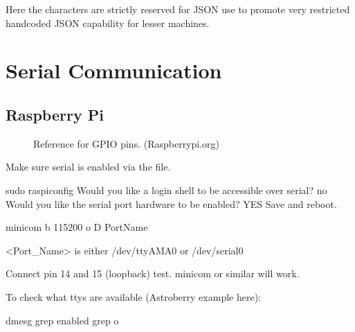 \documentclass[letterpaper,10pt,english,openany,oneside]{sphinxmanual}
\begin{document}
\sphinxAtStartPar
Here the characters  are strictly reserved for JSON use
to promote very restricted hand\sphinxhyphen{}coded JSON capability for lesser
machines.


\chapter{Serial Communication}
\label{\detokenize{serial:serial-communication}}\label{\detokenize{serial::doc}}

\section{Raspberry Pi}
\label{\detokenize{serial:raspberry-pi}}
\begin{figure}[htbp]
\centering
\capstart

\noindent{}
\caption{Reference for GPIO pins. (Raspberrypi.org)}\label{\detokenize{serial:id1}}\end{figure}

\sphinxAtStartPar
Make sure serial is enabled via the  file.

\begin{sphinxVerbatim}[commandchars=\\\{\}]
sudo raspi\PYGZhy{}config
Would you like a login shell to be accessible over serial? no
Would you like the serial port hardware to be enabled? YES
Save and reboot.
\end{sphinxVerbatim}

\begin{sphinxVerbatim}[commandchars=\\\{\}]
minicom \PYGZhy{}b 115200 \PYGZhy{}o \PYGZhy{}D \PYGZlt{}Port\PYGZus{}Name\PYGZgt{}
\end{sphinxVerbatim}

\sphinxAtStartPar
\textless{}Port\_Name\textgreater{} is either /dev/ttyAMA0 or /dev/serial0

\sphinxAtStartPar
Connect pin 14 and 15 (loopback) test.
minicom or similar will work.

\sphinxAtStartPar
To check what ttys are available (Astroberry example here):

\begin{sphinxVerbatim}[commandchars=\\\{\}]
dmesg  grep enabled  grep \PYGZhy{}o \PYGZhy{}\PYGZhy{} 
\end{sphinxVerbatim}
\end{document}
